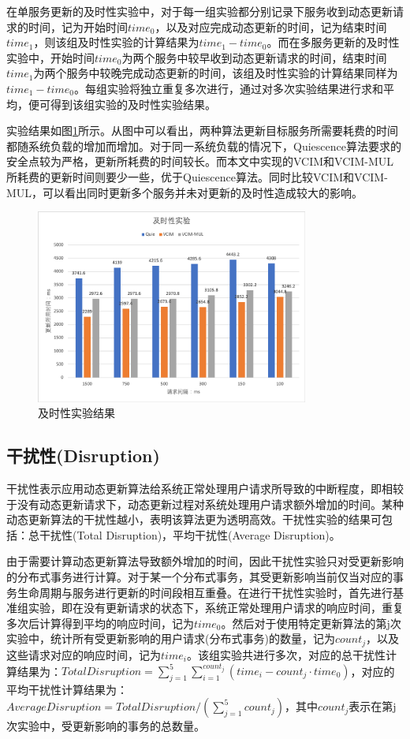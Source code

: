 \documentclass[macfonts,master]{njuthesis}
\begin{document}
在单服务更新的及时性实验中，对于每一组实验都分别记录下服务收到动态更新请求的时间，记为开始时间$time_0$，以及对应完成动态更新的时间，记为结束时间$time_1$，则该组及时性实验的计算结果为$time_1 - time_0$。而在多服务更新的及时性实验中，开始时间$time_0$为两个服务中较早收到动态更新请求的时间，结束时间$time_1$为两个服务中较晚完成动态更新的时间，该组及时性实验的计算结果同样为$time_1 - time_0$。每组实验将独立重复多次进行，通过对多次实验结果进行求和平均，便可得到该组实验的及时性实验结果。

实验结果如图\ref{fig:timeliness}所示。从图中可以看出，两种算法更新目标服务所需要耗费的时间都随系统负载的增加而增加。对于同一系统负载的情况下，Quiescence算法要求的安全点较为严格，更新所耗费的时间较长。而本文中实现的VCIM和VCIM-MUL所耗费的更新时间则要少一些，优于Quiescence算法。同时比较VCIM和VCIM-MUL，可以看出同时更新多个服务并未对更新的及时性造成较大的影响。

\begin{figure}[!htbp]
  \centering
  \includegraphics[width= 0.8\textwidth]{image/timeliness.png}
  \caption{及时性实验结果}
  \label{fig:timeliness}
\end{figure}

\subsection{干扰性(Disruption)}
干扰性表示应用动态更新算法给系统正常处理用户请求所导致的中断程度，即相较于没有动态更新请求下，动态更新过程对系统处理用户请求额外增加的时间。某种动态更新算法的干扰性越小，表明该算法更为透明高效。干扰性实验的结果可包括：总干扰性(Total Disruption)，平均干扰性(Average Disruption)。

由于需要计算动态更新算法导致额外增加的时间，因此干扰性实验只对受更新影响的分布式事务进行计算。对于某一个分布式事务，其受更新影响当前仅当对应的事务生命周期与服务进行更新的时间段相互重叠。在进行干扰性实验时，首先进行基准组实验，即在没有更新请求的状态下，系统正常处理用户请求的响应时间，重复多次后计算得到平均的响应时间，记为$time_0$。然后对于使用特定更新算法的第j次实验中，统计所有受更新影响的用户请求(分布式事务)的数量，记为$count_j$，以及这些请求对应的响应时间，记为$time_i$。该组实验共进行多次，对应的总干扰性计算结果为：$TotalDisruption = \sum_{j=1}^{5}\sum_{i=1}^{count_j}(time_i - count_j \cdot time_0)$，对应的平均干扰性计算结果为：$AverageDisruption = TotalDisruption / (\sum_{j=1}^{5}count_j)$，其中$count_j$表示在第j次实验中，受更新影响的事务的总数量。
\end{document}
